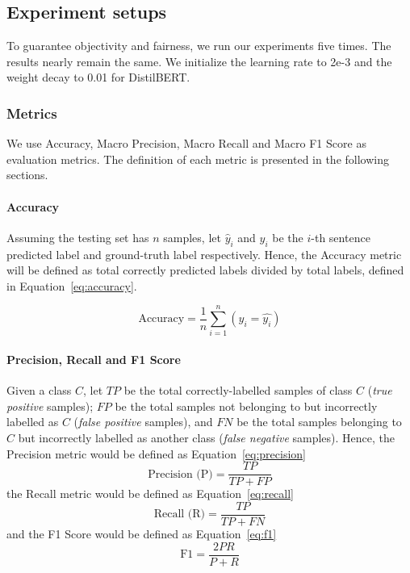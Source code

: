 \documentclass[sn-mathphys,Numbered]{sn-jnl}%
\theoremstyle{thmstyleone}%
\theoremstyle{thmstyletwo}%
\theoremstyle{thmstylethree}%
\begin{document}
\subsection{Experiment setups}
To guarantee objectivity and fairness, we run our experiments five times. The results nearly remain the same. We initialize the learning rate to 2e-3 and the weight decay to 0.01 for DistilBERT. 

\subsubsection{Metrics}
We use Accuracy, Macro Precision, Macro Recall and Macro F1 Score as evaluation metrics. The definition of each metric is presented in the following sections.

\paragraph{Accuracy}
Assuming the testing set has $n$ samples, let $\hat{y}_i$ and $y_i$ be the $i$-th sentence predicted label and ground-truth label respectively. Hence, the Accuracy metric will be defined as total correctly predicted labels divided by total labels, defined in Equation~\ref{eq:accuracy}.

\begin{equation}\label{eq:accuracy}
\text{Accuracy} = \frac{1}{n}\displaystyle\sum_{i = 1}^n (y_i = \hat{y_i})
\end{equation}

\paragraph{Precision, Recall and F1 Score}
Given a class $C$, let $TP$ be the total correctly-labelled samples of class $C$ (\textit{true positive} samples); $FP$ be the total samples not belonging to but incorrectly labelled as $C$ (\textit{false positive} samples), and $FN$ be the total samples belonging to $C$ but incorrectly labelled as another class (\textit{false negative} samples). Hence, the Precision metric would be defined as Equation~\ref{eq:precision}
\begin{equation}\label{eq:precision}
\text{Precision (P)} = \frac{TP}{TP + FP}    
\end{equation}
the Recall metric would be defined as Equation~\ref{eq:recall}
\begin{equation}\label{eq:recall}
\text{Recall (R)} = \frac{TP}{TP + FN}
\end{equation}
and the F1 Score would be defined as Equation~\ref{eq:f1}
\begin{equation}\label{eq:f1}
\text{F1} = \frac{2PR}{P + R}
\end{equation}
\end{document}
